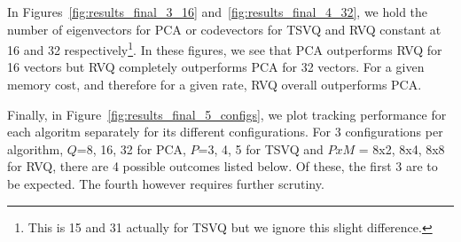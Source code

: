 \begin{Body}
In Figures~\ref{fig:results_final_3_16} and~\ref{fig:results_final_4_32}, we hold the number of eigenvectors for PCA or codevectors for TSVQ and RVQ constant at 16 and 32 respectively\footnote{This is 15 and 31 actually for TSVQ but we ignore this slight difference.}.  In these figures, we see that PCA outperforms RVQ for 16 vectors but RVQ completely outperforms PCA for 32 vectors.  For a given memory cost, and therefore for a given rate, RVQ overall outperforms PCA.  

Finally, in Figure~\ref{fig:results_final_5_configs}, we plot tracking performance for each algoritm separately for its different configurations.  For 3 configurations per algorithm, $Q$=8, 16, 32 for PCA, $P$=3, 4, 5 for TSVQ and $PxM$ = 8x2, 8x4, 8x8 for RVQ, there are 4 possible outcomes listed below.  Of these, the first 3 are to be expected.  The fourth however requires further scrutiny.


\end{Body}
